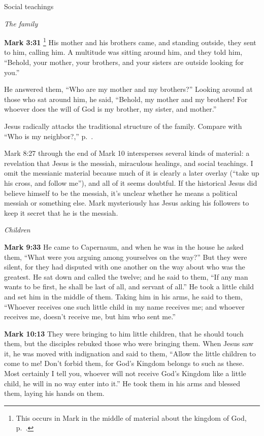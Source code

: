 \documentclass[10pt,twoside]{article} %
\newcommand{\quotesize}{\normalsize{}}
\newcommand{\comm}[1]{\begingroup \color{black!50} #1\endgroup}
\newenvironment{quotetext}{\begingroup\quotesize}{\endgroup}
\newcommand{\bible}[2]{\begin{quotetext}\textbf{#1} #2\end{quotetext}}
\newcommand{\gospelmark}[2]{\bible{Mark #1}{#2}}
\newcommand{\subhead}[1]{\emph{#1}\par}
\begin{document}
\begin{section}{Social teachings}

\subhead{The family}

\gospelmark{3:31}{\label{who-are-my-mother-and-my-brothers}\footnote{This occurs in Mark in the middle of material about the kingdom of God,
p.~\pageref{how-can-satan}.}
  His mother and his brothers came, and standing outside, they sent to him, calling him.   A multitude was sitting around him, and they told him, ``Behold, your mother, your brothers, and your sisters are outside looking for you.''

  He answered them, ``Who are my mother and my brothers?''   Looking around at those who sat around him, he said, ``Behold, my mother and my brothers!    For whoever does the will of God is my brother, my sister, and mother.''
}

\comm{
Jesus radically attacks the traditional structure of the family. Compare with ``Who is my neighbor?,'' p.~\pageref{good-samaritan}.
}

\comm{
Mark 8:27 through the end of Mark 10 intersperses several kinds of material: a revelation that Jesus is the messiah,
miraculous healings, and social teachings. I omit the messianic material because much of it is clearly a later overlay
(``take up his cross, and follow me''),
and all of it seems doubtful. If the historical Jesus did believe himself to be the messiah, it's unclear
whether he means a political messiah or something else.
Mark mysteriously has Jesus asking his followers to keep it secret that he is the messiah.
}

\subhead{Children}

\gospelmark{9:33}{
 He came to Capernaum, and when he was in the house he asked them, ``What were you arguing among yourselves on the way?''
  But they were silent, for they had disputed with one another on the way about who was the greatest.
  He sat down and called the twelve; and he said to them, ``If any man wants to be first, he shall be last of all, and servant of all.''   He took a little child and set him in the middle of them. Taking him in his arms, he said to them,    ``Whoever receives one such little child in my name receives me; and whoever receives me, doesn't receive me, but him who sent me.'' 
}

\gospelmark{10:13}{
They were bringing to him little children, that he should touch them, but the disciples rebuked those who were bringing them.   
When Jesus saw it, he was moved with indignation and said to them, ``Allow the little children to come to me! Don't forbid them, for God's Kingdom belongs to such as these.    Most certainly I tell you, whoever will not receive God's Kingdom like a little child, he will in no way enter into it.''   He took them in his arms and blessed them, laying his hands on them.
}


\end{section}
\end{document}
